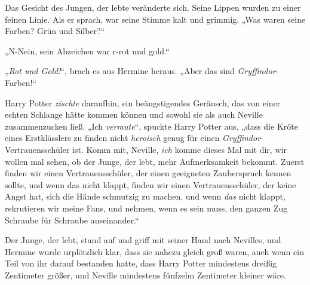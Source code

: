 Das Gesicht des Jungen, der lebte veränderte sich. Seine Lippen wurden zu einer feinen Linie. Als er sprach, war seine Stimme kalt und grimmig. „Was waren seine Farben? Grün und Silber?“

„N-Nein, sein Abzeichen war r-rot und gold.“

„\emph{Rot und Gold!}“, brach es aus Hermine heraus. „Aber das sind \emph{Gryffindor}-Farben!“

Harry Potter \emph{zischte} daraufhin, ein beängstigendes Geräusch, das von einer echten Schlange hätte kommen können und sowohl sie als auch Neville zusammenzucken ließ. „Ich \emph{vermute}“, spuckte Harry Potter aus, „dass die Kröte eines Erstklässlers zu finden nicht \emph{heroisch} genug für einen \emph{Gryffindor}-Vertrauensschüler ist. Komm mit, Neville, \emph{ich} komme dieses Mal mit dir, wir wollen mal sehen, ob der Junge, der lebt, mehr Aufmerksamkeit bekommt. Zuerst finden wir einen Vertrauensschüler, der einen geeigneten Zauberspruch kennen sollte, und wenn das nicht klappt, finden wir einen Vertrauensschüler, der keine Angst hat, sich die Hände schmutzig zu machen, und wenn \emph{das} nicht klappt, rekrutieren wir meine Fans, und nehmen, wenn es sein muss, den ganzen Zug Schraube für Schraube auseinander.“

Der Junge, der lebt, stand auf und griff mit seiner Hand nach Nevilles, und Hermine wurde urplötzlich klar, dass sie nahezu gleich groß waren, auch wenn ein Teil von ihr darauf bestanden hatte, dass Harry Potter mindestens dreißig Zentimeter größer, und Neville mindestens fünfzehn Zentimeter kleiner wäre.

